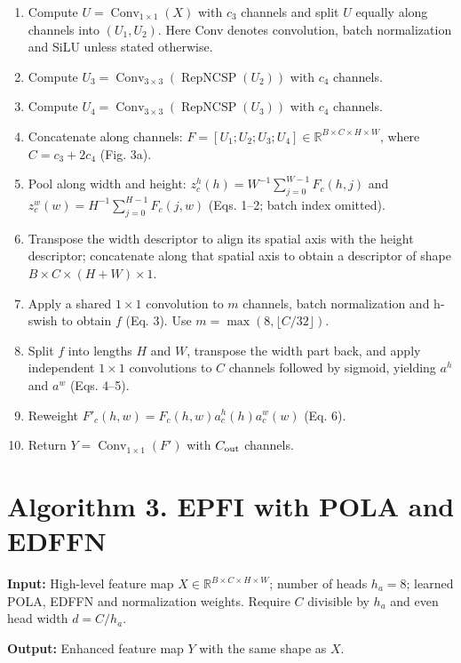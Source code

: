 \documentclass[10pt]{article}
\begin{document}
\begin{enumerate}[label=\arabic*:,leftmargin=2em,itemsep=3pt]
\item Compute $U=\operatorname{Conv}_{1\times1}(X)$ with $c_3$ channels and split $U$ equally along channels into $(U_1,U_2)$. Here Conv denotes convolution, batch normalization and SiLU unless stated otherwise.
\item Compute $U_3=\operatorname{Conv}_{3\times3}(\operatorname{RepNCSP}(U_2))$ with $c_4$ channels.
\item Compute $U_4=\operatorname{Conv}_{3\times3}(\operatorname{RepNCSP}(U_3))$ with $c_4$ channels.
\item Concatenate along channels: $F=[U_1;U_2;U_3;U_4]\in\mathbb R^{B\times C\times H\times W}$, where $C=c_3+2c_4$ (Fig. 3a).
\item Pool along width and height: $z_c^h(h)=W^{-1}\sum_{j=0}^{W-1}F_c(h,j)$ and $z_c^w(w)=H^{-1}\sum_{j=0}^{H-1}F_c(j,w)$ (Eqs. 1--2; batch index omitted).
\item Transpose the width descriptor to align its spatial axis with the height descriptor; concatenate along that spatial axis to obtain a descriptor of shape $B\times C\times(H+W)\times1$.
\item Apply a shared $1\times1$ convolution to $m$ channels, batch normalization and h-swish to obtain $f$ (Eq. 3). Use $m=\max(8,\lfloor C/32\rfloor)$.
\item Split $f$ into lengths $H$ and $W$, transpose the width part back, and apply independent $1\times1$ convolutions to $C$ channels followed by sigmoid, yielding $a^h$ and $a^w$ (Eqs. 4--5).
\item Reweight $F'_c(h,w)=F_c(h,w)a_c^h(h)a_c^w(w)$ (Eq. 6).
\item Return $Y=\operatorname{Conv}_{1\times1}(F')$ with $C_{\rm out}$ channels.
\end{enumerate}
\section*{Algorithm 3. EPFI with POLA and EDFFN}
\textbf{Input:} High-level feature map $X\in\mathbb R^{B\times C\times H\times W}$; number of heads $h_a=8$; learned POLA, EDFFN and normalization weights. Require $C$ divisible by $h_a$ and even head width $d=C/h_a$.

\textbf{Output:} Enhanced feature map $Y$ with the same shape as $X$.
\end{document}
